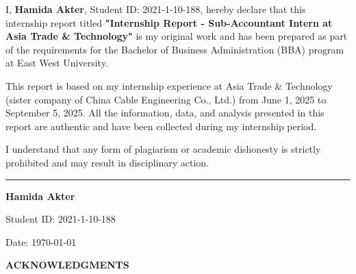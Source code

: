\vspace{2cm}
\begin{minipage}{0.9\textwidth}
    \large
    I, \textbf{Hamida Akter}, Student ID: 2021-1-10-188, hereby declare that this internship report titled \textbf{"Internship Report - Sub-Accountant Intern at Asia Trade \& Technology"} is my original work and has been prepared as part of the requirements for the Bachelor of Business Administration (BBA) program at East West University.
    
    \vspace{1cm}
    This report is based on my internship experience at Asia Trade \& Technology (sister company of China Cable Engineering Co., Ltd.) from June 1, 2025 to September 5, 2025. All the information, data, and analysis presented in this report are authentic and have been collected during my internship period.
    
    \vspace{1cm}
    I understand that any form of plagiarism or academic dishonesty is strictly prohibited and may result in disciplinary action.
    
    \vspace{2cm}
    \begin{minipage}{0.4\textwidth}
        \centering
        \rule{6cm}{0.5pt}
        
        \vspace{0.3cm}
        \textbf{Hamida Akter}
        
        \vspace{0.2cm}
        Student ID: 2021-1-10-188
        
        \vspace{0.2cm}
        Date: \today
    \end{minipage}
\end{minipage}
\par\endgroup

\newpage
\thispagestyle{empty}
\begingroup
\centering

\vspace*{0.5cm}
{\Huge \textbf{ACKNOWLEDGMENTS}}

